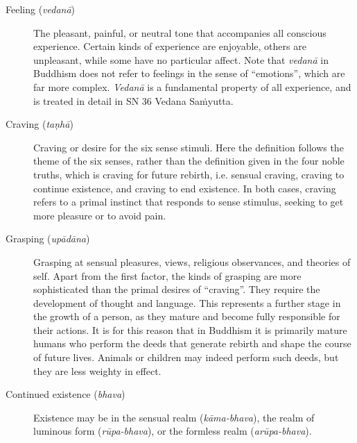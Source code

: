 \documentclass[12pt,openany]{book}%
\begin{document}
\begin{description}
\item[Feeling (\textit{\textsanskrit{vedanā}})] The pleasant, painful, or neutral tone that accompanies all conscious experience.
Certain kinds of experience are enjoyable, others are unpleasant, while some have no particular affect. Note that \textit{\textsanskrit{vedanā}} in Buddhism does not refer to feelings in the sense of “emotions”, which are far more complex. \textit{\textsanskrit{Vedanā}} is a fundamental property of all experience, and is treated in detail in SN 36 Vedana \textsanskrit{Saṁyutta}.%
\item[Craving (\textit{\textsanskrit{taṇhā}})] Craving or desire for the six sense stimuli.
Here the definition follows the theme of the six senses, rather than the definition given in the four noble truths, which is craving for future rebirth, i.e. sensual craving, craving to continue existence, and craving to end existence. In both cases, craving refers to a primal instinct that responds to sense stimulus, seeking to get more pleasure or to avoid pain.%
\item[Grasping (\textit{\textsanskrit{upādāna}})] Grasping at sensual pleasures, views, religious observances, and theories of self.
Apart from the first factor, the kinds of grasping are more sophisticated than the primal desires of “craving”. They require the development of thought and language. This represents a further stage in the growth of a person, as they mature and become fully responsible for their actions. It is for this reason that in Buddhism it is primarily mature humans who perform the deeds that generate rebirth and shape the course of future lives. Animals or children may indeed perform such deeds, but they are less weighty in effect.%
\item[Continued existence (\textit{bhava})] Existence may be in the sensual realm (\textit{\textsanskrit{kāma}-bhava}), the realm of luminous form (\textit{\textsanskrit{rūpa}-bhava}), or the formless realm (\textit{\textsanskrit{arūpa}-bhava}).

\end{description}
\end{document}
